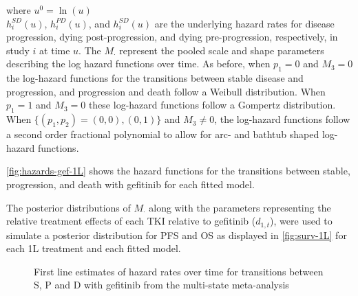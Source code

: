 \documentclass[11pt,final,fleqn]{article}\usepackage[]{graphicx}\usepackage[]{color}
\theoremstyle{plain}
\begin{document}
{where $u^0= \ln(u)$
\\

$h_{i}^{SD}(u)$, $h_{i}^{PD}(u)$, and $h_{i}^{SD}(u)$ are the underlying hazard rates for disease progression, dying post-progression, and dying pre-progression, respectively, in study $i$ at time $u$. The $M_{\cdot}$ represent the pooled scale and shape parameters describing the log hazard functions over time. As before, when $p_{1}=0$ and $M_{3}=0$ the log-hazard functions for the transitions between stable disease and progression, and progression and death follow a Weibull distribution. When $p_{1}=1$ and $M_{3}=0$ these log-hazard functions follow a Gompertz distribution. When $\{(p_1, p_2) = (0, 0), (0,1)\}$ and $M_{3}\neq0$, the log-hazard functions follow a second order fractional polynomial to allow for arc- and bathtub shaped log-hazard functions. 

\autoref{fig:hazards-gef-1L} shows the hazard functions for the transitions between stable, progression, and death with gefitinib for each fitted model.

The posterior distributions of $M_{\cdot}$ along with the parameters representing the relative treatment effects of each TKI relative to gefitinib ($d_{1, t}$), were used to simulate a posterior distribution for PFS and OS as displayed in \autoref{fig:surv-1L} for each 1L treatment and each fitted model. 


\begin{figure}[h]
\centering
\caption{First line estimates of hazard rates over time for transitions between S, P and D with gefitinib from the multi-state meta-analysis}\label{fig:hazards-gef-1L}
\end{figure}


}
\end{document}
